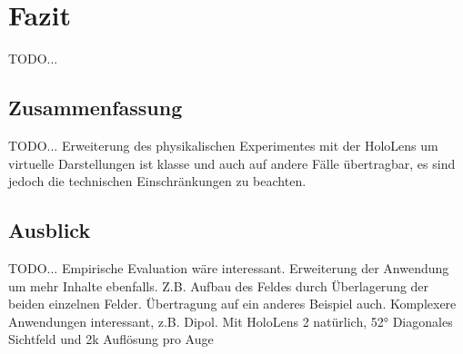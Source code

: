 \section{Fazit}

TODO...
\subsection{Zusammenfassung}
TODO...
Erweiterung des physikalischen Experimentes mit der HoloLens um virtuelle Darstellungen ist klasse und auch auf andere Fälle übertragbar, es sind jedoch die technischen Einschränkungen zu beachten.

\subsection{Ausblick}
TODO...
Empirische Evaluation wäre interessant. Erweiterung der Anwendung um mehr Inhalte ebenfalls. Z.B. Aufbau des Feldes durch Überlagerung der beiden einzelnen Felder. Übertragung auf ein anderes Beispiel auch. Komplexere Anwendungen interessant, z.B. Dipol. Mit HoloLens 2 natürlich, 52° Diagonales Sichtfeld und 2k Auflösung pro Auge